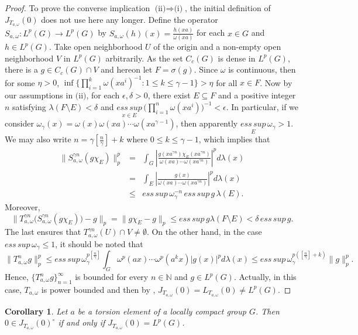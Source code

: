 \documentclass{amsart}
\newtheorem{cor}[thm]{Corollary}
\theoremstyle{definition}\newtheorem{defn}[thm]{Definition}
\theoremstyle{remark}
\numberwithin{equation}{section}
\begin{document}
\begin{proof}
To  prove the converse implication
$\mbox{(ii)}\Rightarrow\mbox{(i)}$, the initial definition of
$J_{T_{a,\omega}}(0)$ does not use here any longer. Define the
operator $S_{a,\omega}:L^p(G)\rightarrow L^p(G)$ by
$S_{a,\omega}(h)(x)=\frac{h(xa)}{\omega(xa)}$ for each $x\in G$ and
$h\in L^p(G)$. Take open neighborhood $U$ of the origin and a
non-empty open neighborhood $V$ in $L^p(G)$  arbitrarily. As the set
$C_c(G)$ is dense in $L^p(G)$,  there is a $g\in C_c(G)\cap V$ and
hereon let $F=\sigma(g)$. Since $\omega$ is continuous, then for
some $\eta>0$, $\inf\{\prod_{i=1}^{k}\omega(xa^{i})^{-1}: 1\leq
k\leq\gamma-1\}>\eta$ for all $x\in F$. Now by our assumptions in
$\mbox{(ii)}$, for each $\epsilon,\delta>0$, there exist $E\subseteq
F$ and a positive integer $n$ satisfying $\lambda(F\setminus
E)<\delta$ and $\underset{x\in
E}{ess\,sup}\,\big(\prod_{i=1}^{n}\omega(xa^{i})\big)^{-1}<\epsilon$.
In particular, if we consider
$\omega_{\gamma}(x)=\omega(x)\omega(xa)\cdots\omega(xa^{\gamma-1})$,
then apparently $\underset{E}{ess\,sup}\,\omega_{\gamma}>1$. We may
also write  $n=\gamma[\frac{n}{\gamma}]+k$ where $0\leq
k\leq\gamma-1$, which implies  that
\begin{eqnarray*}
\|S_{a,\omega}^{\gamma n}(g\chi_{E})\|_{p}^{p} &=&
\int_G\left|\frac{g(xa^{\gamma n})\chi_{E}(xa^{\gamma n})}{\omega(x a)\cdots\omega(xa^{\gamma n})}\right|^p d\lambda(x)\\
&=&
\int_{E}\left|\frac{g(x)}{\omega(x a)\cdots\omega(xa^{\gamma n})}\right|^p d\lambda(x)\\
&\leq&
\underset{}{ess\,sup}\,\omega_{\gamma}^{-n}\,\underset{}{ess\,sup}\,
g\,\lambda(E).
\end{eqnarray*}
Moreover,
$$
\|T_{a,\omega}^{\gamma n}\big(S_{a,\omega}^{\gamma
n}(g\chi_{E})\big)-g\|_p= \|g\chi_{E}-g\|_p\leq
ess\,sup\,g\lambda(F\setminus E)<\delta \,{ess\,sup}\,g.
$$
The last ensures  that $T_{a,\omega}^{\gamma n}(U)\cap
V\neq\emptyset$. On the other hand, in the case
${ess\,sup}\,\omega_{\gamma} \leq 1$, it should be noted that
$$
\|T^{n}_{a,\omega}g\|_{p}^{p}\leq
ess\,sup\,\omega_{\gamma}^{p[\frac{n}{\gamma}]}\int_G
\omega^p(ax)\cdots\omega^p(a^{k}x)|g(x)|^p d\lambda(x)\leq
ess\,sup\,\omega_{\gamma}^{p([\frac{n}{\gamma}]+k)}\|g\|_p^p.
$$
Hence, $\{T^{n}_{a,\omega}g\}_{n=1}^{\infty}$ is bounded for every
$n\in\mathbb{N}$ and $g\in L^p(G)$. Actually, in this case,
$T_{a,\omega}$ is power bounded and then by \cite[Proposition
2.10]{man}, $J_{T_{a,\omega}}(0)=L_{T_{a,\omega}}(0)\neq L^p(G)$.
\end{proof}
\begin{cor}
Let $a$ be a torsion element of a locally compact group $G$. Then
$0\in J_{T_{a,\omega}}(0)^\circ$ if and only if
$J_{T_{a,\omega}}(0)=L^p(G)$.
\end{cor}
\end{document}
